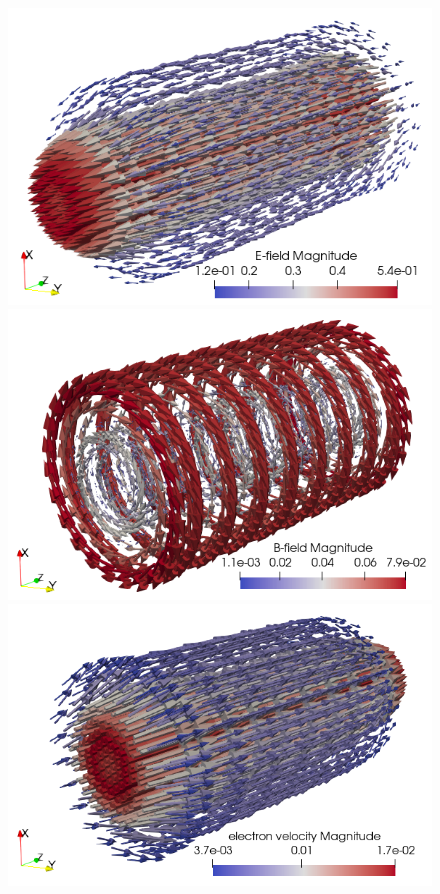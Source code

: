 \documentclass{article}
\begin{document}
\begin{figure}
    \centering
    \includegraphics[scale=0.35]{E_lambda_1.png}
    \includegraphics[scale=0.35]{B_lambda_1.png}
    \includegraphics[scale=0.35]{ue_lambda_1.png} \\

\end{figure}
\end{document}
